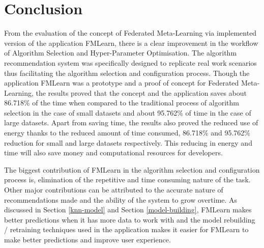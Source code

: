 \chapter{Conclusion}

From the evaluation of the concept of Federated Meta-Learning via implemented version of the application FMLearn, there is a clear improvement in the workflow of Algorithm Selection and Hyper-Parameter Optimisation. The algorithm recommendation system was specifically designed to replicate real work scenarios thus facilitating the algorithm selection and configuration process. Though the application FMLearn was a prototype and a proof of concept for Federated Meta-Learning, the results proved that the concept and the application saves about 86.718\% of the time when compared to the traditional process of algorithm selection in the case of small datasets and about 95.762\% of time in the case of large datasets. Apart from saving time, the results also proved the reduced use of energy thanks to the reduced amount of time consumed, 86.718\% and 95.762\% reduction for small and large datasets respectively. This reducing in energy and time will also save money and computational resources for developers.

The biggest contribution of FMLearn in the algorithm selection and configuration process is, elimination of the repetitive and time consuming nature of the task. Other major contributions can be attributed to the accurate nature of recommendations made and the ability of the system to grow overtime. As discussed in Section \ref{knn-model} and Section \ref{model-building}, FMLearn makes better predictions when it has more data to work with and the model rebuilding / retraining techniques used in the application makes it easier for FMLearn to make better predictions and improve user experience. 